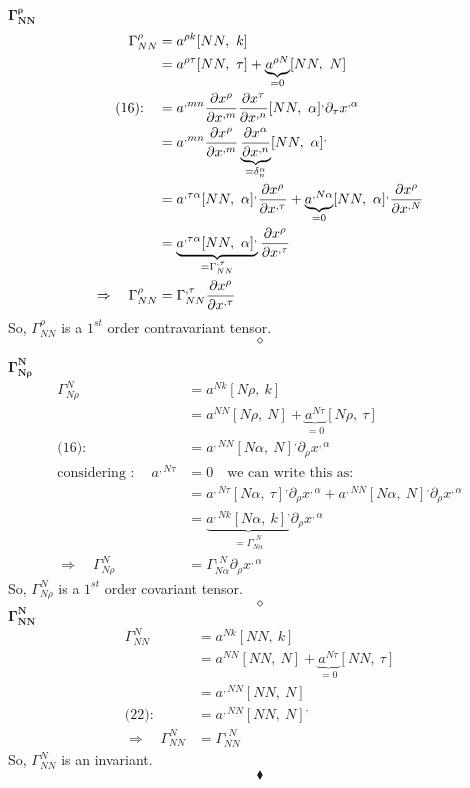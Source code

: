 $\boldsymbol{\Gamma^{\rho}_{N N}}$\\
\begin{align}
\Gamma^{\rho }_{N N} &= a^{\rho  k}[N N,\ k]\\
\ & = a^{\rho \tau}[N N,\ \tau]+ \underbrace{a^{\rho N}}_{=0}[N N,\ N]\\
\text{(16):}\quad &= a^{,mn}\pdv{x^\rho}{x^{,m}}\pdv{x^\tau}{x^{,n}}[NN, \ \alpha]^, \partial_{\tau}x^{,\alpha}\\
\ &= a^{,mn}\pdv{x^\rho}{x^{,m}} \underbrace{\pdv{x^{\alpha}}{x^{,n}}}_{= \delta^{\alpha}_{n}}[NN, \ \alpha]^, \\
\ &= a^{, \tau \alpha}[NN, \ \alpha]^,\pdv{x^\rho}{x^{, \tau}}+  \underbrace{a^{,N \alpha}}_{=0}[NN, \ \alpha]^,\pdv{x^\rho}{x^{,N}} \\
\ &= \underbrace{a^{, \tau \alpha}[NN, \ \alpha]^,}_{= \Gamma^{, \tau}_{NN}}\pdv{x^\rho}{x^{, \tau}}  \\
\Rightarrow \quad \Gamma^{\rho }_{N N} &= \Gamma^{, \tau}_{NN}\pdv{x^\rho}{x^{, \tau}}  
\end{align}
So, $\Gamma^{\rho }_{N N}$ is a $1^{st}$ order contravariant tensor.
$$\diamond$$

$\boldsymbol{\Gamma^{N}_{N \rho}}$\\
\begin{align}
\Gamma^{N}_{N \rho} &= a^{N  k}[N \rho,\ k]\\
\ & = a^{N N}[N \rho,\ N]+ \underbrace{a^{N \tau}}_{=0}[N \rho,\ \tau]\\
\text{(16):}\quad &= a^{,NN}[N\alpha, \ N ]^, \partial_{\rho}x^{,\alpha}\\
\text{considering :}\quad \ a^{,N \tau} & =0 \quad \text{we can write this as:}\\
\ &= a^{,N\tau}[N\alpha, \ \tau ]^, \partial_{\rho}x^{,\alpha}+ a^{,NN}[N\alpha, \ N ]^, \partial_{\rho}x^{,\alpha}\\
\ &= \underbrace{a^{,N k}[N \alpha, \ k ]^,}_{= \Gamma^{,N}_{N \alpha}} \partial_{\rho}x^{,\alpha}\\
\Rightarrow \quad \Gamma^{N}_{N \rho} &= \Gamma^{,N}_{N \alpha} \partial_{\rho}x^{,\alpha}
\end{align}
So, $\Gamma^{N}_{N \rho}$ is a $1^{st}$ order covariant tensor.
$$\diamond$$
\newpage
$\boldsymbol{\Gamma^{N}_{N N}}$\\
\begin{align}
\Gamma^{N}_{N N} &= a^{N  k}[N N,\ k]\\
\ & = a^{N N}[N N,\ N]+ \underbrace{a^{N \tau}}_{=0}[N N,\ \tau]\\
\ & = a^{,N N}[N N,\ N]\\
\text{(22):}\quad &= a^{,N N}[N N,\ N]^,\\
\Rightarrow \quad \Gamma^{N}_{N N} &= \Gamma^{,N}_{N N}
\end{align}
So, $\Gamma^{N}_{N N}$ is an invariant.
$$\blacklozenge$$
\newpage
